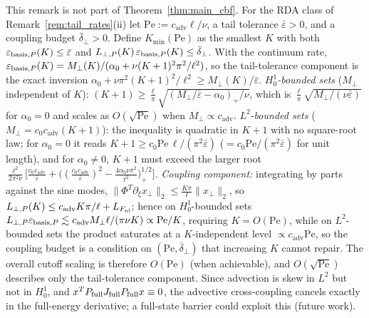 \begin{remark}
\label{rem:rda_cutoff}
This remark is not part of Theorem~\ref{thm:main_cbf}. For the RDA class of Remark~\ref{rem:tail_rates}(ii) let \(\mathrm{Pe} := c_{\mathrm{adv}}\ell/\nu\), a tail tolerance \(\bar\varepsilon > 0\), and a coupling budget \(\bar\delta_\perp > 0\). Define \(K_{\min}(\mathrm{Pe})\) as the smallest \(K\) with both \(\varepsilon_{\mathrm{basis},P}(K) \le \bar\varepsilon\) and \(L_{\perp,P}(K)\,\varepsilon_{\mathrm{basis},P}(K) \le \bar\delta_\perp\). With the continuum rate, \(\varepsilon_{\mathrm{basis},P}(K) = M_\perp(K)/(\alpha_0 + \nu(K+1)^2\pi^2/\ell^2)\), so the tail-tolerance component is the exact inversion
\(\alpha_0 + \nu\pi^2(K+1)^2/\ell^2 \ge M_\perp(K)/\bar\varepsilon\). \emph{\(H_0^1\)-bounded sets} (\(M_\perp\) independent of \(K\)): \((K+1) \ge \frac{\ell}{\pi}\sqrt{(M_\perp/\bar\varepsilon - \alpha_0)_+/\nu}\), which is \(\frac{\ell}{\pi}\sqrt{M_\perp/(\nu\bar\varepsilon)}\) for \(\alpha_0 = 0\) and scales as \(O(\sqrt{\mathrm{Pe}})\) when \(M_\perp \propto c_{\mathrm{adv}}\). \emph{\(L^2\)-bounded sets} (\(M_\perp = c_0c_{\mathrm{adv}}(K+1)\)): the inequality is quadratic in \(K+1\) with no square-root law; for \(\alpha_0 = 0\) it reads \(K + 1 \ge c_0\mathrm{Pe}\,\ell/(\pi^2\bar\varepsilon)\) (\(= c_0\mathrm{Pe}/(\pi^2\bar\varepsilon)\) for unit length), and for \(\alpha_0 \neq 0\), \(K+1\) must exceed the larger root \(\frac{\ell^2}{2\pi^2\nu}\big[\frac{c_0c_{\mathrm{adv}}}{\bar\varepsilon} + \big((\frac{c_0c_{\mathrm{adv}}}{\bar\varepsilon})^2 - \frac{4\alpha_0\nu\pi^2}{\ell^2}\big)_+^{1/2}\big]\). \emph{Coupling component:} integrating by parts against the sine modes, \(\|\Phi^T\partial_\xi x_\perp\|_2 \le \frac{K\pi}{\ell}\|x_\perp\|_2\), so \(L_{\perp,P}(K) \le c_{\mathrm{adv}}K\pi/\ell + L_{F_{\mathrm{nl}}}\); hence on \(H_0^1\)-bounded sets \(L_{\perp,P}\varepsilon_{\mathrm{basis},P} \lesssim c_{\mathrm{adv}}M_\perp\ell/(\pi\nu K) \propto \mathrm{Pe}/K\), requiring \(K = O(\mathrm{Pe})\), while on \(L^2\)-bounded sets the product saturates at a \(K\)-independent level \(\propto c_{\mathrm{adv}}\mathrm{Pe}\), so the coupling budget is a condition on \((\mathrm{Pe}, \bar\delta_\perp)\) that increasing \(K\) cannot repair. The overall cutoff scaling is therefore \(O(\mathrm{Pe})\) (when achievable), and \(O(\sqrt{\mathrm{Pe}})\) describes only the tail-tolerance component. Since advection is skew in \(L^2\) but not in \(H_0^1\), and \(x^TP_{\mathrm{full}} J_{\mathrm{full}}P_{\mathrm{full}} x \equiv 0\), the advective cross-coupling cancels exactly in the full-energy derivative; a full-state barrier could exploit this (future work).
\end{remark}

